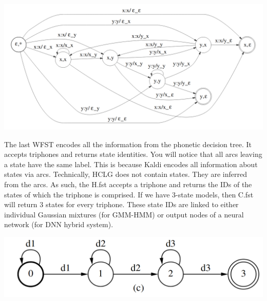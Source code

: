 \documentclass[10pt,a4paper]{article}
\begin{document}
\begin{center}
  \includegraphics[width=.9\textwidth,keepaspectratio]{figs/mohri-C.png}
\end{center}

The last WFST encodes all the information from the phonetic decision tree. It accepts triphones and returns state identities. You will notice that all arcs leaving a state have the same label. This is because Kaldi encodes all information about states via arcs. Technically, HCLG does not contain states. They are inferred from the arcs. As such, the H.fst accepts a triphone and returns the IDs of the states of which the triphone is comprised. If we have 3-state models, then C.fst will return 3 states for every triphone. These state IDs are linked to either individual Gaussian mixtures (for GMM-HMM) or output nodes of a neural network (for DNN hybrid system).


\begin{center}
  \includegraphics[width=.9\textwidth,keepaspectratio]{figs/mohri-H.png}
\end{center}
\end{document}
